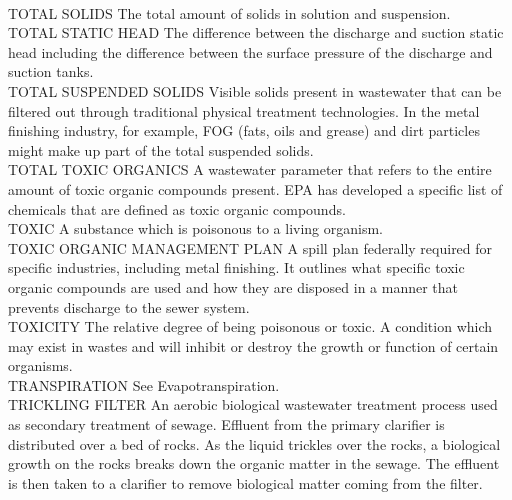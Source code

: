 \documentclass{article}
\begin{document}
\vspace{0.3cm}\\
TOTAL SOLIDS
The total amount of solids in solution and suspension.
\vspace{0.3cm}\\
TOTAL STATIC HEAD
The difference between the discharge and suction static head including the difference between the surface pressure of the discharge and suction tanks.
\vspace{0.3cm}\\
TOTAL SUSPENDED SOLIDS
Visible solids present in wastewater that can be filtered out through traditional physical treatment technologies. In the metal finishing industry, for example, FOG (fats, oils and grease) and dirt particles might make up part of the total suspended solids.
\vspace{0.3cm}\\
TOTAL TOXIC ORGANICS
A wastewater parameter that refers to the entire amount of toxic organic compounds present.   EPA has developed a specific list of chemicals that are defined as toxic organic compounds.
\vspace{0.3cm}\\
TOXIC
A substance which is poisonous to a living organism.
\vspace{0.3cm}\\
TOXIC ORGANIC MANAGEMENT PLAN
A spill plan federally required for specific industries, including metal finishing. It outlines what specific toxic organic compounds are used and how they are disposed in a manner that prevents discharge to the sewer system.
\vspace{0.3cm}\\
TOXICITY
The relative degree of being poisonous or toxic. A condition which may exist in wastes and will inhibit or destroy the growth or function of certain organisms.
\vspace{0.3cm}\\
TRANSPIRATION
See Evapotranspiration.
\vspace{0.3cm}\\
TRICKLING FILTER
An aerobic biological wastewater treatment process used as secondary treatment of sewage. Effluent from the primary clarifier is distributed over a bed of rocks. As the liquid trickles over the rocks, a biological growth on the rocks breaks down the organic matter in the sewage. The effluent is then taken to a clarifier to remove biological matter coming from the filter.
\vspace{0.3cm}\\
\end{document}
